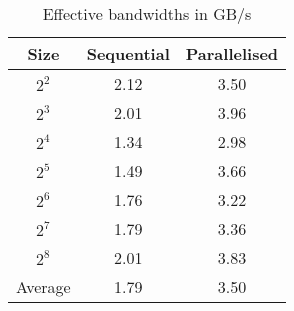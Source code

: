 \begin{table}[h!tb]
    \centering
    \caption{\label{table:bandwidths}Effective bandwidths in GB/s}
    \begin{tabular}{@{} c c c @{}}
    \toprule
        \textbf{Size} & \textbf{Sequential}& \textbf{Parallelised}\\
    \midrule
        $2^2$ & 2.12 & 3.50\\
    \lightrule
        $2^3$ & 2.01 & 3.96\\
    \lightrule
        $2^4$ & 1.34 & 2.98\\
    \lightrule
        $2^5$ & 1.49 & 3.66\\
    \lightrule
        $2^6$ & 1.76 & 3.22\\
    \lightrule
        $2^7$ & 1.79 & 3.36\\
    \lightrule
        $2^8$ & 2.01 & 3.83 \\
    \midrule
        Average & 1.79 & 3.50\\
    \bottomrule
    \end{tabular}
\end{table}